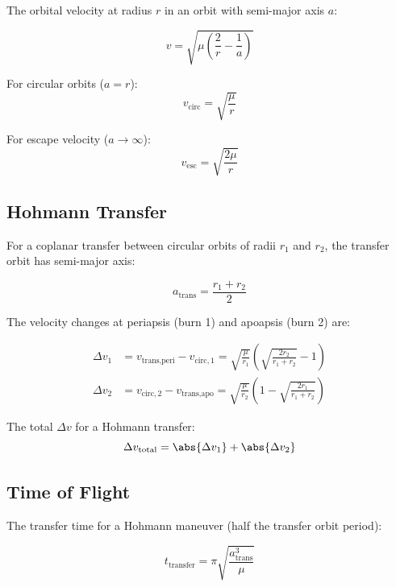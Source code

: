 \documentclass[11pt,a4paper]{article}
\begin{document}
The orbital velocity at radius $r$ in an orbit with semi-major axis $a$:

\begin{equation}
    v = \sqrt{\mu \left( \frac{2}{r} - \frac{1}{a} \right)}
    \label{eq:visviva}
\end{equation}

For circular orbits ($a = r$):
\begin{equation}
    v_\text{circ} = \sqrt{\frac{\mu}{r}}
\end{equation}

For escape velocity ($a \to \infty$):
\begin{equation}
    v_\text{esc} = \sqrt{\frac{2\mu}{r}}
\end{equation}

\subsection{Hohmann Transfer}

For a coplanar transfer between circular orbits of radii $r_1$ and $r_2$, the transfer orbit has semi-major axis:

\begin{equation}
    a_\text{trans} = \frac{r_1 + r_2}{2}
\end{equation}

The velocity changes at periapsis (burn 1) and apoapsis (burn 2) are:

\begin{align}
    \Delta v_1 &= v_\text{trans,peri} - v_{\text{circ},1} = \sqrt{\frac{\mu}{r_1}} \left( \sqrt{\frac{2r_2}{r_1 + r_2}} - 1 \right) \\
    \Delta v_2 &= v_{\text{circ},2} - v_\text{trans,apo} = \sqrt{\frac{\mu}{r_2}} \left( 1 - \sqrt{\frac{2r_1}{r_1 + r_2}} \right)
\end{align}

The total $\Delta v$ for a Hohmann transfer:
\begin{equation}
    \Delta v_\text{total} = \abs{\Delta v_1} + \abs{\Delta v_2}
\end{equation}

\subsection{Time of Flight}

The transfer time for a Hohmann maneuver (half the transfer orbit period):

\begin{equation}
    t_\text{transfer} = \pi \sqrt{\frac{a_\text{trans}^3}{\mu}}
\end{equation}
\end{document}
